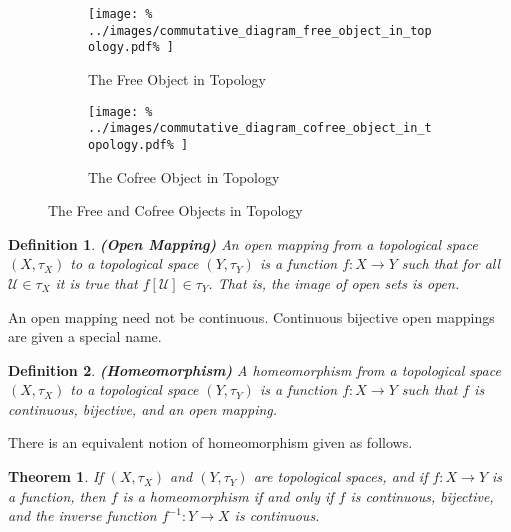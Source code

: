 \documentclass{article}
\theoremstyle{plain}
\newtheorem{theorem}{Theorem}[section]
\theoremstyle{normal}
\newtheorem{definition}{Definition}[section]
\begin{document}
        \begin{figure}
        	\centering
        	\begin{subfigure}[b]{0.48\textwidth}
                \centering
                \texttt{[image: \%
                    ../images/commutative\_diagram\_free\_object\_in\_topology.pdf\%
                ]}
                \caption{The Free Object in Topology}
                \label{fig:commutative_diagram_free_object_in_topology}
            \end{subfigure}
            \begin{subfigure}[b]{0.5\textwidth}
                \centering
                \texttt{[image: \%
                    ../images/commutative\_diagram\_cofree\_object\_in\_topology.pdf\%
                ]}
                \caption{The Cofree Object in Topology}
                \label{fig:commutative_diagram_cofree_object_in_topology}
            \end{subfigure}
            \caption{The Free and Cofree Objects in Topology}
            \label{fig:free_and_cofree_objects_in_topology}
        \end{figure}
        \begin{definition}{\textbf{(Open Mapping)}}
            An open mapping from a topological space $(X,\tau_{X})$ to a
            topological space $(Y,\tau_{Y})$ is a function $f:X\rightarrow{Y}$
            such that for all $\mathcal{U}\in\tau_{X}$ it is true that
            $f[\mathcal{U}]\in\tau_{Y}$. That is, the image of open sets is
            open.
        \end{definition}
        An open mapping need not be continuous. Continuous bijective open
        mappings are given a special name.
        \begin{definition}{\textbf{(Homeomorphism)}}
            A homeomorphism from a topological space $(X,\tau_{X})$ to a
            topological space $(Y,\tau_{Y})$ is a function $f:X\rightarrow{Y}$
            such that $f$ is continuous, bijective, and an open mapping.
        \end{definition}
        There is an equivalent notion of homeomorphism given as follows.
        \begin{theorem}
            If $(X,\tau_{X})$ and $(Y,\tau_{Y})$ are topological spaces, and if
            $f:X\rightarrow{Y}$ is a function, then $f$ is a homeomorphism if
            and only if $f$ is continuous, bijective, and the inverse function
            $f^{-1}:Y\rightarrow{X}$ is continuous.
        \end{theorem}
\end{document}
